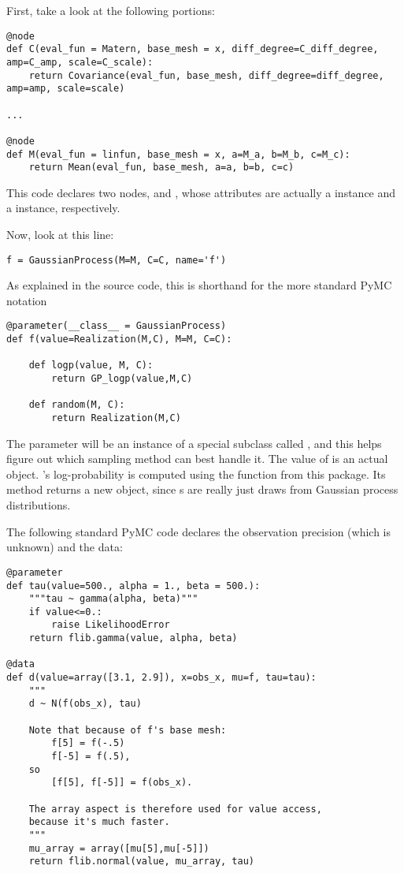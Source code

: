 \documentclass{manual}
\begin{document}
First, take a look at the following portions:
\begin{verbatim}
@node
def C(eval_fun = Matern, base_mesh = x, diff_degree=C_diff_degree, amp=C_amp, scale=C_scale):
    return Covariance(eval_fun, base_mesh, diff_degree=diff_degree, amp=amp, scale=scale)

...

@node
def M(eval_fun = linfun, base_mesh = x, a=M_a, b=M_b, c=M_c):
    return Mean(eval_fun, base_mesh, a=a, b=b, c=c)

\end{verbatim}
This code declares two nodes,  and , whose  attributes are actually a  instance and a  instance, respectively.  

Now, look at this line:
\begin{verbatim}
f = GaussianProcess(M=M, C=C, name='f')
\end{verbatim}
As explained in the source code, this is shorthand for the more standard PyMC notation
\begin{verbatim}
@parameter(__class__ = GaussianProcess)
def f(value=Realization(M,C), M=M, C=C):

    def logp(value, M, C):
        return GP_logp(value,M,C)

    def random(M, C):
        return Realization(M,C)
\end{verbatim}
The parameter  will be an instance of a special  subclass called , and this helps  figure out which sampling method can best handle it. The value of  is an actual  object. 's log-probability is computed using the  function from this package. Its  method returns a new  object, since s are really just draws from Gaussian process distributions.


The following standard PyMC code declares the observation precision (which is unknown) and the data:
\begin{verbatim}
@parameter
def tau(value=500., alpha = 1., beta = 500.):
    """tau ~ gamma(alpha, beta)"""
    if value<=0.:
        raise LikelihoodError
    return flib.gamma(value, alpha, beta)

@data
def d(value=array([3.1, 2.9]), x=obs_x, mu=f, tau=tau):
    """
    d ~ N(f(obs_x), tau)

    Note that because of f's base mesh:
        f[5] = f(-.5)
        f[-5] = f(.5),
    so
        [f[5], f[-5]] = f(obs_x).
        
    The array aspect is therefore used for value access,
    because it's much faster.
    """
    mu_array = array([mu[5],mu[-5]])
    return flib.normal(value, mu_array, tau)
\end{verbatim}
\end{document}
